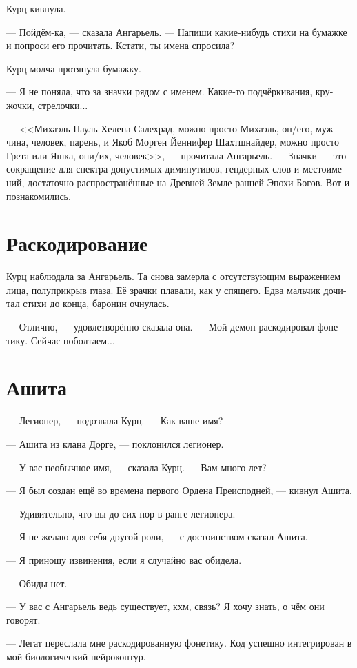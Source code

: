 \documentclass[a4paper,12pt,fleqn]{book}\usepackage{polyglossia}\setdefaultlanguage[babelshorthands=true]{russian}\setotherlanguage{english}\defaultfontfeatures{Ligatures=TeX,Mapping=tex-text}\usepackage{xcolor}\newcommand{\ml}[3]{#2}
\begin{document}
Курц кивнула.

--- Пойдём-ка, --- сказала Ангарьель.
--- Напиши какие-нибудь стихи на бумажке и попроси его прочитать.
Кстати, ты имена спросила?

Курц молча протянула бумажку.

--- Я не поняла, что за значки рядом с именем.
Какие-то подчёркивания, кружочки, стрелочки...

--- <<Михаэль Пауль Хелена Салехрад, можно просто Михаэль, он/его, мужчина, человек, парень, и Якоб Морген Йеннифер Шахтшнайдер, можно просто Грета или Яшка, они/их, человек>>, --- прочитала Ангарьель.
--- Значки --- это сокращение для спектра допустимых диминутивов, гендерных слов и местоимений, достаточно распространённые на Древней Земле ранней Эпохи Богов.
Вот и познакомились.

\section{Раскодирование}

Курц наблюдала за Ангарьель.
Та снова замерла с отсутствующим выражением лица, полуприкрыв глаза.
Её зрачки плавали, как у спящего.
Едва мальчик дочитал стихи до конца, баронин очнулась.

--- Отлично, --- удовлетворённо сказала она.
--- Мой демон раскодировал фонетику.
Сейчас поболтаем...

\section{Ашита}

--- Легионер, --- подозвала Курц.
--- Как ваше имя?

--- Ашита из клана Дорге, --- поклонился легионер.

--- У вас необычное имя, --- сказала Курц.
--- Вам много лет?

--- Я был создан ещё во времена первого Ордена Преисподней, --- кивнул Ашита.

--- Удивительно, что вы до сих пор в ранге легионера.

--- Я не желаю для себя другой роли, --- с достоинством сказал Ашита.

--- Я приношу извинения, если я случайно вас обидела.

--- Обиды нет.

--- У вас с Ангарьель ведь существует, кхм, связь?
Я хочу знать, о чём они говорят.

--- Легат переслала мне раскодированную фонетику.
Код успешно интегрирован в мой биологический нейроконтур.
\end{document}
